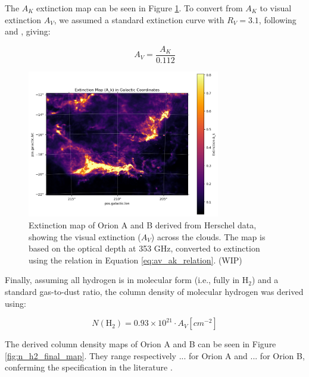 The $A_K$ extinction map can be seen in Figure \ref{fig:extinction_map}. 
To convert from $A_K$ to visual extinction $A_V$, we assumed a standard extinction curve with $R_V = 3.1$, following \cite{bohlin1978survey} and \cite{rieke1985interstellar}, giving:

\begin{equation}
    A_V = \frac{A_K}{0.112}
    \label{eq:av_ak_relation}
\end{equation}

\begin{figure}
    \centering
    \includegraphics[width=0.75\textwidth]{figures/extinction_map.png}
    \caption{Extinction map of Orion A and B derived from Herschel data, showing the visual extinction ($A_V$) across the clouds. The map is based on the optical depth at 353 GHz, converted to extinction using the relation in Equation \ref{eq:av_ak_relation}. (WIP)}
    \label{fig:extinction_map}
\end{figure}

Finally, assuming all hydrogen is in molecular form (i.e., fully in H$_2$) and a standard gas-to-dust ratio, the column density of molecular hydrogen was derived using:

\begin{equation}
    N(\mathrm{H_2}) = 0.93 \times 10^{21} \cdot A_V [cm^{-2}]
    \label{eq:n_h2_av_relation}
\end{equation}

The derived column density maps of Orion A and B can be seen in Figure \ref{fig:n_h2_final_map}. They range respectively ... for Orion A and ... for Orion B, conferming the specification in the literature \cite{lombardi2014herschel}. 

